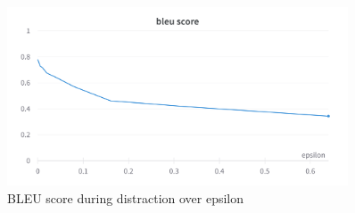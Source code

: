 \begin{figure}
    \includegraphics[width=0.9\textwidth]{figures/distraction_bleu_score_over_epsilon.png}
    \caption{BLEU score during distraction over epsilon}
\end{figure}




